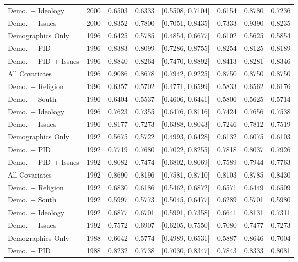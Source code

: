 \begin{longtable}{lrrrlrrr}
  Demo. + Ideology & 2000 & 0.6503 & 0.6333 & [0.5508, 0.7104] & 0.6154 & 0.8780 & 0.7236 \\ 
  Demo. + Issues & 2000 & 0.8352 & 0.7800 & [0.7051, 0.8435] & 0.7333 & 0.9390 & 0.8235 \\ 
  Demographics Only & 1996 & 0.6425 & 0.5785 & [0.4854, 0.6677] & 0.6102 & 0.5625 & 0.5854 \\ 
  Demo. + PID & 1996 & 0.8383 & 0.8099 & [0.7286, 0.8755] & 0.8254 & 0.8125 & 0.8189 \\ 
  Demo. + PID + Issues & 1996 & 0.8840 & 0.8264 & [0.7470, 0.8892] & 0.8413 & 0.8281 & 0.8346 \\ 
  All Covariates & 1996 & 0.9086 & 0.8678 & [0.7942, 0.9225] & 0.8750 & 0.8750 & 0.8750 \\ 
  Demo. + Religion & 1996 & 0.6357 & 0.5702 & [0.4771, 0.6599] & 0.5833 & 0.6562 & 0.6176 \\ 
  Demo. + South & 1996 & 0.6404 & 0.5537 & [0.4606, 0.6441] & 0.5806 & 0.5625 & 0.5714 \\ 
  Demo. + Ideology & 1996 & 0.7623 & 0.7355 & [0.6476, 0.8116] & 0.7424 & 0.7656 & 0.7538 \\ 
  Demo. + Issues & 1996 & 0.8177 & 0.7273 & [0.6388, 0.8043] & 0.7246 & 0.7812 & 0.7519 \\ 
  Demographics Only & 1992 & 0.5675 & 0.5722 & [0.4993, 0.6428] & 0.6132 & 0.6075 & 0.6103 \\ 
  Demo. + PID & 1992 & 0.7719 & 0.7680 & [0.7022, 0.8255] & 0.7818 & 0.8037 & 0.7926 \\ 
  Demo. + PID + Issues & 1992 & 0.8082 & 0.7474 & [0.6802, 0.8069] & 0.7589 & 0.7944 & 0.7763 \\ 
  All Covariates & 1992 & 0.8690 & 0.8196 & [0.7581, 0.8710] & 0.8103 & 0.8785 & 0.8430 \\ 
  Demo. + Religion & 1992 & 0.6830 & 0.6186 & [0.5462, 0.6872] & 0.6571 & 0.6449 & 0.6509 \\ 
  Demo. + South & 1992 & 0.5997 & 0.5773 & [0.5045, 0.6477] & 0.6289 & 0.5701 & 0.5980 \\ 
  Demo. + Ideology & 1992 & 0.6877 & 0.6701 & [0.5991, 0.7358] & 0.6641 & 0.8131 & 0.7311 \\ 
  Demo. + Issues & 1992 & 0.7572 & 0.6907 & [0.6205, 0.7550] & 0.7080 & 0.7477 & 0.7273 \\ 
  Demographics Only & 1988 & 0.6642 & 0.5774 & [0.4989, 0.6531] & 0.5887 & 0.8646 & 0.7004 \\ 
  Demo. + PID & 1988 & 0.8232 & 0.7738 & [0.7030, 0.8347] & 0.7843 & 0.8333 & 0.8081 \\ 

\end{longtable}
